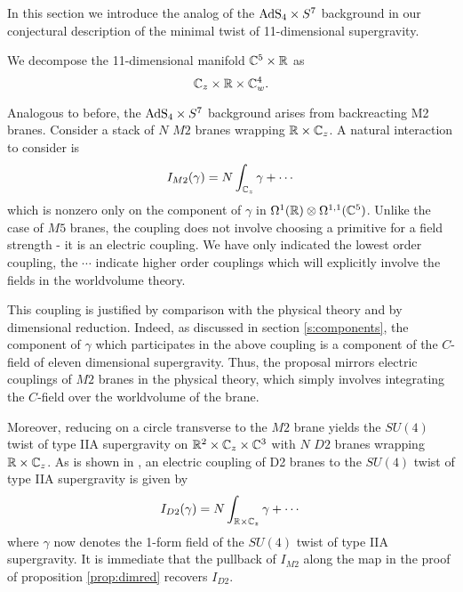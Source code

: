 In this section we introduce the analog of the ${\rm AdS}_4 \times S^7$ background in our conjectural description of the minimal twist of 11-dimensional supergravity. 

\parsec[]

We decompose the 11-dimensional manifold $\mathbb C^5 \times \mathbb R$ as
\[
\mathbb C_z \times \mathbb R \times \mathbb C^4_w .
\]

Analogous to before, the ${\rm AdS}_4 \times S^7$ background arises from backreacting M2 branes. Consider a stack of $N$ $M2$ branes wrapping $\mathbb{R}\times \mathbb{C}_z$. A natural interaction to consider is 
\[
I_{M2}(\gamma) = N\int_{\mathbb{C}_z} \gamma + \cdots
\] 
which is nonzero only on the component of $\gamma$ in $\Omega^1(\mathbb{R})\otimes \Omega^{1,1}(\mathbb{C}^5)$. Unlike the case of $M5$ branes, the coupling does not involve choosing a primitive for a field strength - it is an electric coupling.
We have only indicated the lowest order coupling, the $\cdots$ indicate higher order couplings which will explicitly involve the fields in the worldvolume theory. 

This coupling is justified by comparison with the physical theory and by dimensional reduction. 
Indeed, as discussed in section \ref{s:components}, the component of $\gamma$ which participates in the above coupling is a component of the $C$-field of eleven dimensional supergravity. Thus, the proposal mirrors electric couplings of $M2$ branes in the physical theory, which simply involves integrating the $C$-field over the worldvolume of the brane. 

Moreover, reducing on a circle transverse to the $M2$ brane yields the $SU(4)$ twist of type IIA supergravity on $\mathbb{R}^2\times \mathbb{C}_z\times \mathbb{C}^3$ with $N$ $D2$ branes wrapping $\mathbb{R}\times \mathbb{C}_z$. As is shown in \cite{CLsugra}, an electric coupling of D2 branes to the $SU(4)$ twist of type IIA supergravity is given by 
\[
I_{D2}(\gamma) = N \int_{\mathbb{R}\times\mathbb{C}_z} \gamma + \cdots
\] 
where $\gamma$ now denotes the 1-form field of the $SU(4)$ twist of type IIA supergravity. It is immediate that the pullback of $I_{M2}$ along the map in the proof of proposition \ref{prop:dimred} recovers $I_{D2}$. 




